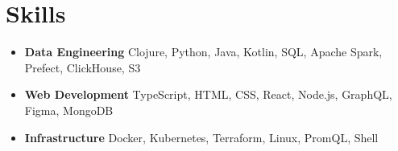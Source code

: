 \documentclass[letterpaper,11pt]{article}
\newcommand{\resumeItem}[2]{
  \item\small{
    \textbf{#1}{ #2 \vspace{-2pt}}
  }
}
\newcommand{\resumeSubItem}[2]{\resumeItem{#1}{#2}\vspace{-4pt}}
\newcommand{\resumeSubHeadingListStart}{\begin{itemize}[leftmargin=*]}
\newcommand{\resumeSubHeadingListEnd}{\end{itemize}}
\begin{document}
\section{Skills}
 \resumeSubHeadingListStart
    \resumeSubItem{Data Engineering}
      {Clojure, Python, Java, Kotlin, SQL, Apache Spark, Prefect, ClickHouse, S3}
    \resumeSubItem{Web Development}
      {TypeScript, HTML, CSS, React, Node.js, GraphQL, Figma, MongoDB}
    \resumeSubItem{Infrastructure}
      {Docker, Kubernetes, Terraform, Linux, PromQL, Shell}
 \resumeSubHeadingListEnd
\end{document}
